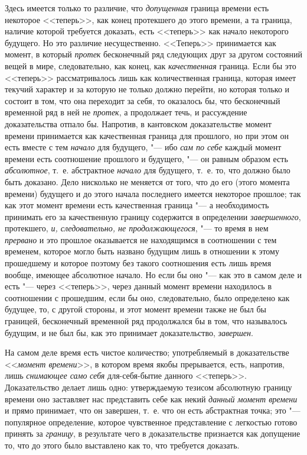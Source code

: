 Здесь имеется только то различие, что {\em допущенная}
граница времени есть некоторое <<теперь>>, как конец протекшего до этого
времени, а та граница, наличие которой требуется доказать, есть <<теперь>>
как начало некоторого будущего. Но это различие несущественно. <<Теперь>>
принимается как момент, в который {\em протек}
бесконечный ряд следующих друг за другом состояний вещей в мире,
следовательно, как конец, как {\em качественная}
граница. Если бы это <<теперь>> рассматривалось лишь как количественная
граница, которая имеет текучий характер и за которую не только должно
перейти, но которая только и состоит в том, что она переходит за себя, то
оказалось бы, что бесконечный временной ряд в ней не
{\em протек}, а продолжает течь, и рассуждение
доказательства отпало бы. Напротив, в кантовском доказательстве момент
времени принимается как качественная граница для прошлого, но при этом он
есть вместе с тем {\em начало} для будущего, "--- ибо
{\em сам по себе} каждый момент времени есть
соотношение прошлого и будущего, "--- он равным образом есть
{\em абсолютное}, т.~е. абстрактное
{\em начало} для будущего, т.~е. то, что должно было
быть доказано. Дело нисколько не меняется от того, что до его (этого
момента времени) будущего и до этого начала последнего имеется некоторое
прошлое; так как этот момент времени есть качественная граница "--- а
необходимость принимать его за качественную границу содержится в
определении {\em завершенного}, протекшего,
{\em и, следовательно, не продолжающегося}, "--- то время
в нем {\em прервано} и это прошлое оказывается не
находящимся в соотношении с тем временем, которое могло быть названо
будущим лишь в отношении к этому прошедшему и которое поэтому без такого
соотношения есть лишь время вообще, имеющее абсолютное начало. Но если бы
оно "--- как это в самом деле и есть "--- через <<теперь>>, через данный момент
времени находилось в соотношении с прошедшим, если бы оно, следовательно,
было определено как будущее, то, с другой стороны, и этот момент времени
также не был бы границей, бесконечный временной ряд продолжался бы в том,
что называлось будущим, и не был бы, как это принимает доказательство,
{\em завершен}.

На самом деле время есть чистое количество; употребляемый в доказательстве
<<{\em момент времени}>>, в котором время якобы
прерывается, есть, напротив, лишь {\em снимающее само}
{\em себя} для-себя-бытие данного <<теперь>>.
Доказательство делает лишь одно: утверждаемую тезисом абсолютную границу
времени оно заставляет нас представить себе как некий
{\em данный момент времени} и прямо принимает, что он
завершен, т.~е. что он есть абстрактная точка; это "--- популярное
определение, которое чувственное представление с легкостью готово принять
за {\em границу}, в результате чего в доказательстве
признается как допущение то, что до этого было выставлено как то, что
требуется доказать.

